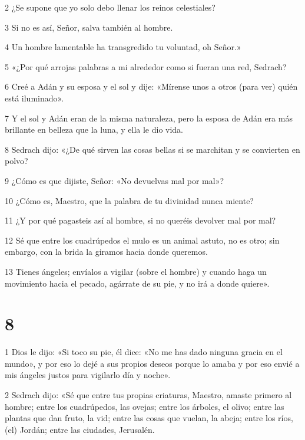 \par 2 ¿Se supone que yo solo debo llenar los reinos celestiales?

\par 3 Si no es así, Señor, salva también al hombre.

\par 4 Un hombre lamentable ha transgredido tu voluntad, oh Señor.»

\par 5 «¿Por qué arrojas palabras a mi alrededor como si fueran una red, Sedrach?

\par 6 Creé a Adán y su esposa y el sol y dije: «Mírense unos a otros (para ver) quién está iluminado».

\par 7 Y el sol y Adán eran de la misma naturaleza, pero la esposa de Adán era más brillante en belleza que la luna, y ella le dio vida.

\par 8 Sedrach dijo: «¿De qué sirven las cosas bellas si se marchitan y se convierten en polvo?

\par 9 ¿Cómo es que dijiste, Señor: «No devuelvas mal por mal»?

\par 10 ¿Cómo es, Maestro, que la palabra de tu divinidad nunca miente?

\par 11 ¿Y por qué pagasteis así al hombre, si no queréis devolver mal por mal?

\par 12 Sé que entre los cuadrúpedos el mulo es un animal astuto, no es otro; sin embargo, con la brida la giramos hacia donde queremos.

\par 13 Tienes ángeles; envíalos a vigilar (sobre el hombre) y cuando haga un movimiento hacia el pecado, agárrate de su pie, y no irá a donde quiere».

\chapter{8}

\par 1 Dios le dijo: «Si toco su pie, él dice: «No me has dado ninguna gracia en el mundo», y por eso lo dejé a sus propios deseos porque lo amaba y por eso envié a mis ángeles justos para vigilarlo día y noche».

\par 2 Sedrach dijo: «Sé que entre tus propias criaturas, Maestro, amaste primero al hombre; entre los cuadrúpedos, las ovejas; entre los árboles, el olivo; entre las plantas que dan fruto, la vid; entre las cosas que vuelan, la abeja; entre los ríos, (el) Jordán; entre las ciudades, Jerusalén.

